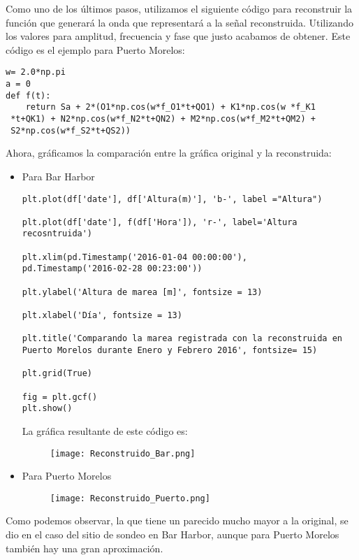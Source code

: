 \documentclass{article}
\begin{document}
\onecolumn
Como uno de los últimos pasos, utilizamos el siguiente código para reconstruir la función que generará la onda que representará a la señal reconstruida. Utilizando los valores para amplitud, frecuencia y fase que justo acabamos de obtener. Este código es el ejemplo para Puerto Morelos:\\
\begin{verbatim}
w= 2.0*np.pi
a = 0
def f(t):
    return Sa + 2*(O1*np.cos(w*f_O1*t+QO1) + K1*np.cos(w *f_K1
 *t+QK1) + N2*np.cos(w*f_N2*t+QN2) + M2*np.cos(w*f_M2*t+QM2) +
 S2*np.cos(w*f_S2*t+QS2))
\end{verbatim}
Ahora, gráficamos la comparación entre la gráfica original y la reconstruida:\\
\begin{itemize}
\item Para Bar Harbor
\begin{verbatim}
plt.plot(df['date'], df['Altura(m)'], 'b-', label ="Altura")

plt.plot(df['date'], f(df['Hora']), 'r-', label='Altura recosntruida')

plt.xlim(pd.Timestamp('2016-01-04 00:00:00'),
pd.Timestamp('2016-02-28 00:23:00'))

plt.ylabel('Altura de marea [m]', fontsize = 13)

plt.xlabel('Día', fontsize = 13)

plt.title('Comparando la marea registrada con la reconstruida en
Puerto Morelos durante Enero y Febrero 2016', fontsize= 15)

plt.grid(True) 

fig = plt.gcf()
plt.show()
\end{verbatim}
\newpage
La gráfica resultante de este código es:\\

\begin{figure}[h]
\texttt{[image: Reconstruido\_Bar.png]}
\end{figure}

\item Para Puerto Morelos
\begin{figure}[h]
\texttt{[image: Reconstruido\_Puerto.png]}
\end{figure}
\end{itemize}

Como podemos observar, la que tiene un parecido mucho mayor a la original, se dio en el caso del sitio de sondeo en Bar Harbor, aunque para Puerto Morelos también hay una gran aproximación.\\
\end{document}
